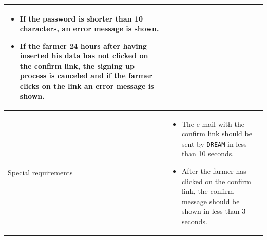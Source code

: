 \documentclass{article}
\begin{document}
\begin{longtable}{|p{3.5cm}|m{8cm}|}
\begin{itemize}
     \item If the password is shorter than 10 characters, an error message is shown.
     \item If the farmer 24 hours after having inserted his data has not clicked on the confirm link, the signing up process is canceled and if the farmer clicks on the link an error message is shown.
 \end{itemize}\\
 \hline
 Special requirements &
 \begin{itemize}
     \item The e-mail with the confirm link should be sent by \verb|DREAM| in less than 10 seconds.
     \item After the farmer has clicked on the confirm link, the confirm message should be shown in less than 3 seconds.
 \end{itemize}\\
 \hline
\end{longtable}
\end{document}
